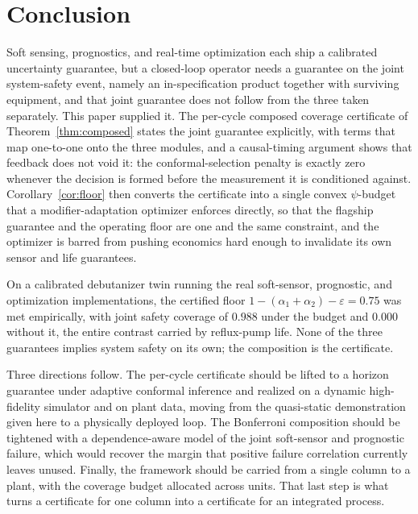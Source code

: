 \section{Conclusion}
\label{sec:conclusion}

Soft sensing, prognostics, and real-time optimization each ship a calibrated uncertainty
guarantee, but a closed-loop operator needs a guarantee on the joint system-safety event,
namely an in-specification product together with surviving equipment, and that joint
guarantee does not follow from the three taken separately. This paper supplied it. The
per-cycle composed coverage certificate of Theorem~\ref{thm:composed} states the joint
guarantee explicitly, with terms that map one-to-one onto the three modules, and a
causal-timing argument shows that feedback does not void it: the conformal-selection
penalty is exactly zero whenever the decision is formed before the measurement it is
conditioned against. Corollary~\ref{cor:floor} then converts the certificate into a
single convex $\psi$-budget that a modifier-adaptation optimizer enforces directly, so
that the flagship guarantee and the operating floor are one and the same constraint, and
the optimizer is barred from pushing economics hard enough to invalidate its own sensor
and life guarantees.

On a calibrated debutanizer twin running the real soft-sensor, prognostic, and
optimization implementations, the certified floor $1-(\alpha_1+\alpha_2)-\varepsilon =
0.75$ was met empirically, with joint safety coverage of $0.988$ under the budget and
$0.000$ without it, the entire contrast carried by reflux-pump life. None of the three
guarantees implies system safety on its own; the composition is the certificate.

Three directions follow. The per-cycle certificate should be lifted to a horizon
guarantee under adaptive conformal inference and realized on a dynamic high-fidelity
simulator and on plant data, moving from the quasi-static demonstration given here to a
physically deployed loop. The Bonferroni composition should be tightened with a
dependence-aware model of the joint soft-sensor and prognostic failure, which would
recover the margin that positive failure correlation currently leaves unused. Finally,
the framework should be carried from a single column to a plant, with the coverage budget
allocated across units. That last step is what turns a certificate for one column into a
certificate for an integrated process.
